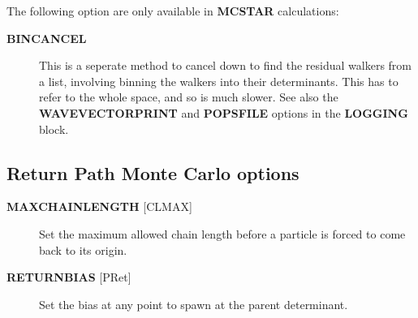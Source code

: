 \documentclass[openany,a4paper,10pt]{manual}
\begin{document}
The following option are only available in \textbf{MCSTAR} calculations:
\begin{description}
\item[\textbf{BINCANCEL}]
This is a seperate method to cancel down to find the residual
walkers from a list, involving binning the walkers into their
determinants. This has to refer to the whole space, and so is
much slower.  See also the \textbf{WAVEVECTORPRINT} and \textbf{POPSFILE}
options in the \textbf{LOGGING} block.

\end{description}


\subsection{Return Path Monte Carlo options}
\begin{description}
\item[\textbf{MAXCHAINLENGTH} {[}CLMAX{]}]
Set the maximum allowed chain length before a particle is forced to
come back to its origin.

\item[\textbf{RETURNBIAS} {[}PRet{]}]
Set the bias at any point to spawn at the parent determinant.

\end{description}
\end{document}
